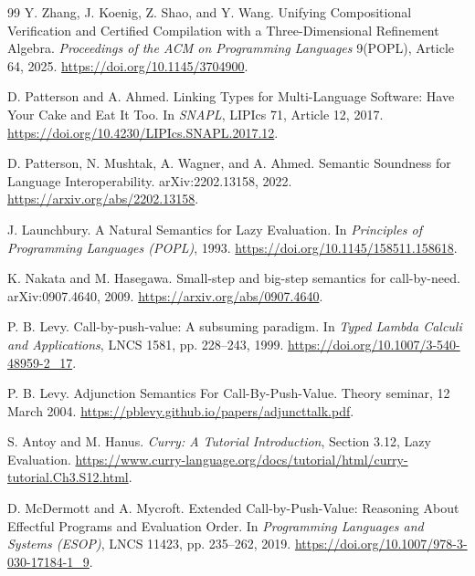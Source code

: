 \documentclass[11pt]{article}
\theoremstyle{definition}
\theoremstyle{remark}
\begin{document}
\begin{thebibliography}{99}
Y. Zhang, J. Koenig, Z. Shao, and Y. Wang.
\newblock Unifying Compositional Verification and Certified Compilation
  with a Three-Dimensional Refinement Algebra.
\newblock \emph{Proceedings of the ACM on Programming Languages}
  9(POPL), Article 64, 2025.
\newblock \url{https://doi.org/10.1145/3704900}.

D. Patterson and A. Ahmed.
\newblock Linking Types for Multi-Language Software: Have Your Cake and Eat It Too.
\newblock In \emph{SNAPL}, LIPIcs 71, Article 12, 2017.
\newblock \url{https://doi.org/10.4230/LIPIcs.SNAPL.2017.12}.

D. Patterson, N. Mushtak, A. Wagner, and A. Ahmed.
\newblock Semantic Soundness for Language Interoperability.
\newblock arXiv:2202.13158, 2022.
\newblock \url{https://arxiv.org/abs/2202.13158}.

J. Launchbury.
\newblock A Natural Semantics for Lazy Evaluation.
\newblock In \emph{Principles of Programming Languages (POPL)}, 1993.
\newblock \url{https://doi.org/10.1145/158511.158618}.

K. Nakata and M. Hasegawa.
\newblock Small-step and big-step semantics for call-by-need.
\newblock arXiv:0907.4640, 2009.
\newblock \url{https://arxiv.org/abs/0907.4640}.

P. B. Levy.
\newblock Call-by-push-value: A subsuming paradigm.
\newblock In \emph{Typed Lambda Calculi and Applications}, LNCS 1581,
  pp. 228--243, 1999.
\newblock \url{https://doi.org/10.1007/3-540-48959-2_17}.

P. B. Levy.
\newblock Adjunction Semantics For Call-By-Push-Value.
\newblock Theory seminar, 12 March 2004.
\newblock \url{https://pblevy.github.io/papers/adjuncttalk.pdf}.

S. Antoy and M. Hanus.
\newblock \emph{Curry: A Tutorial Introduction}, Section 3.12, Lazy Evaluation.
\newblock \url{https://www.curry-language.org/docs/tutorial/html/curry-tutorial.Ch3.S12.html}.

D. McDermott and A. Mycroft.
\newblock Extended Call-by-Push-Value: Reasoning About Effectful Programs and
  Evaluation Order.
\newblock In \emph{Programming Languages and Systems (ESOP)}, LNCS 11423,
  pp. 235--262, 2019.
\newblock \url{https://doi.org/10.1007/978-3-030-17184-1_9}.


\end{thebibliography}
\end{document}
